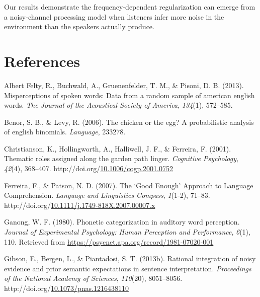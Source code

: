 \documentclass[10pt, letterpaper]{article}
\newenvironment{CSLReferences}%
  {}%
  {\par}
\begin{document}
Our results demonstrate the frequency-dependent regularization can
emerge from a noisy-channel processing model when listeners infer more
noise in the environment than the speakers actually produce.

\hypertarget{references}{%
\section{References}\label{references}}

\setlength{\parindent}{-0.1in} 
\setlength{\leftskip}{0.125in}

\noindent

\hypertarget{refs}{}
\begin{CSLReferences}{1}{0}
\leavevmode{}%
Albert Felty, R., Buchwald, A., Gruenenfelder, T. M., \& Pisoni, D. B.
(2013). Misperceptions of spoken words: Data from a random sample of
american english words. \emph{The Journal of the Acoustical Society of
America}, \emph{134}(1), 572--585.

\leavevmode{}%
Benor, S. B., \& Levy, R. (2006). The chicken or the egg? A
probabilistic analysis of english binomials. \emph{Language}, 233278.

\leavevmode{}%
Christianson, K., Hollingworth, A., Halliwell, J. F., \& Ferreira, F.
(2001). Thematic roles assigned along the garden path linger.
\emph{Cognitive Psychology}, \emph{42}(4), 368--407.
http://doi.org/\href{https://doi.org/10.1006/cogp.2001.0752}{10.1006/cogp.2001.0752}

\leavevmode{}%
Ferreira, F., \& Patson, N. D. (2007). The {`}Good Enough{'} Approach to
Language Comprehension. \emph{Language and Linguistics Compass},
\emph{1}(1-2), 71--83.
http://doi.org/\href{https://doi.org/10.1111/j.1749-818X.2007.00007.x}{10.1111/j.1749-818X.2007.00007.x}

\leavevmode{}%
Ganong, W. F. (1980). Phonetic categorization in auditory word
perception. \emph{Journal of Experimental Psychology: Human Perception
and Performance}, \emph{6}(1), 110. Retrieved from
\url{https://psycnet.apa.org/record/1981-07020-001}

\leavevmode{}%
Gibson, E., Bergen, L., \& Piantadosi, S. T. (2013b). Rational
integration of noisy evidence and prior semantic expectations in
sentence interpretation. \emph{Proceedings of the National Academy of
Sciences}, \emph{110}(20), 8051--8056.
http://doi.org/\href{https://doi.org/10.1073/pnas.1216438110}{10.1073/pnas.1216438110}


\end{CSLReferences}
\end{document}
